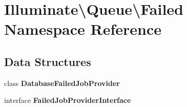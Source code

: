 \section{Illuminate\textbackslash{}Queue\textbackslash{}Failed Namespace Reference}
\label{namespace_illuminate_1_1_queue_1_1_failed}
\subsection*{Data Structures}
\begin{DoxyCompactItemize}
\item 
class {\bf Database\+Failed\+Job\+Provider}
\item 
interface {\bf Failed\+Job\+Provider\+Interface}
\end{DoxyCompactItemize}
